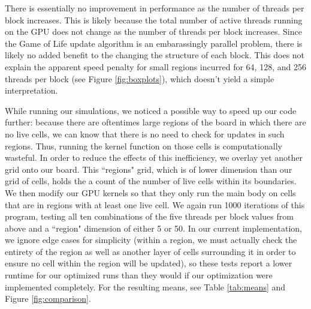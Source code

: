 \documentclass[onecolumn,12pt]{IEEEtran}
\begin{document}
There is essentially no improvement in performance as the number of threads per
block increases. This is likely because the total number of active threads
running on the GPU does not change as the number of threads per block
increases. Since the Game of Life update algorithm is an embarassingly parallel
problem, there is likely no added benefit to the changing the structure of each
block. This does not explain the apparent speed penalty for small regions
incurred for 64, 128, and 256 threads per block (see Figure
\ref{fig:boxplots}), which doesn't yield a simple interpretation.

While running our simulations, we noticed a possible way to speed up our code
further: because there are oftentimes large regions of the board in which there
are no live cells, we can know that there is no need to check for updates in
such regions. Thus, running the kernel function on those cells is
computationally wasteful. In order to reduce the effects of this inefficiency,
we overlay yet another grid onto our board. This ``regions" grid, which is of
lower dimension than our grid of cells, holds the a count of the number of live
cells within its boundaries. We then modify our GPU kernels so that they only
run the main body on cells that are in regions with at least one live cell. We
again run 1000 iterations of this program, testing all ten combinations of the
five threads per block values from above and a ``region" dimension of either 5
or 50. In our current implementation, we ignore edge cases for simplicity
(within a region, we must actually check the entirety of the region as well as
another layer of cells surrounding it in order to ensure no cell within the
region will be updated), so these tests report a lower runtime for our
optimized runs than they would if our optimization were implemented completely.
For the resulting means, see Table \ref{tab:means} and Figure \ref{fig:comparison}.
\end{document}
